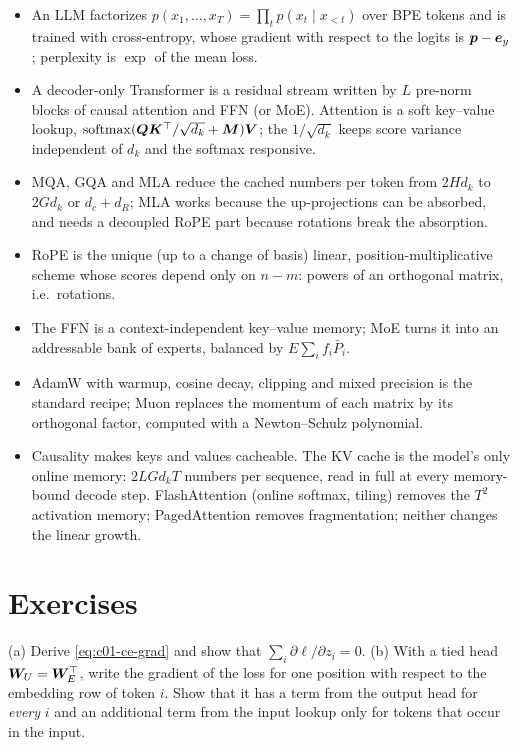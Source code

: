 \begin{summarybox}
\begin{itemize}
  \item An LLM factorizes $p(x_1, \dots, x_T) = \prod_t p(x_t\mid x_{<t})$ over BPE tokens and
  is trained with cross-entropy, whose gradient with respect to the logits is
  $\bm{p} - \bm{e}_y$; perplexity is $\exp$ of the mean loss.
  \item A decoder-only Transformer is a residual stream written by $L$ pre-norm blocks of
  causal attention and FFN (or MoE). Attention is a soft key--value lookup,
  $\operatorname{softmax}(\bm{Q}\bm{K}^{\top}/\sqrt{d_k} + \bm{M})\bm{V}$; the $1/\sqrt{d_k}$ keeps score variance
  independent of $d_k$ and the softmax responsive.
  \item MQA, GQA and MLA reduce the cached numbers per token from $2Hd_k$ to $2Gd_k$ or
  $d_c + d_R$; MLA works because the up-projections can be absorbed, and needs a decoupled
  RoPE part because rotations break the absorption.
  \item RoPE is the unique (up to a change of basis) linear, position-multiplicative scheme
  whose scores depend only on $n - m$: powers of an orthogonal matrix, i.e.\ rotations.
  \item The FFN is a context-independent key--value memory; MoE turns it into an addressable
  bank of experts, balanced by $E\sum_i f_i\bar{P}_i$.
  \item AdamW with warmup, cosine decay, clipping and mixed precision is the standard recipe;
  Muon replaces the momentum of each matrix by its orthogonal factor, computed with a
  Newton--Schulz polynomial.
  \item Causality makes keys and values cacheable. The KV cache is the model's only online
  memory: $2LGd_kT$ numbers per sequence, read in full at every memory-bound decode step.
  FlashAttention (online softmax, tiling) removes the $T^2$ activation memory; PagedAttention
  removes fragmentation; neither changes the linear growth.
\end{itemize}
\end{summarybox}

\section*{Exercises}

\begin{exercise}\label{ex:c01-ce-gradient}
(a) Derive \eqref{eq:c01-ce-grad} and show that $\sum_i \partial\ell/\partial z_i = 0$.
(b) With a tied head $\bm{W}_U = \bm{W}_E^{\top}$, write the gradient of the loss for one position with
respect to the embedding row of token $i$. Show that it has a term from the output head for
\emph{every} $i$ and an additional term from the input lookup only for tokens that occur in
the input.
\end{exercise}

